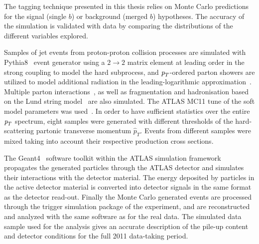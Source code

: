 The tagging technique presented in this thesis relies on Monte Carlo predictions for the signal (single $b$) or background (merged $b$) hypotheses. The accuracy of the simulation is validated with data by comparing the distributions of the different variables explored.

Samples of jet events from proton-proton collision processes are simulated with {\sc Pythia8}~\cite{PYTHIA8} event generator using a $2\rightarrow 2$ matrix element at leading order in the strong coupling to model the hard subprocess, and ${\emph{p}_{T}}$-ordered parton showers are utilized to model additional radiation in the leading-logarithmic approximation~\cite{Pythia_partonshowers}. Multiple parton interactions~\cite{Pythia_mpi}, as well as fragmentation and hadronisation based on the Lund string model~\cite{Lund_string_model} are also simulated.
The ATLAS MC11 tune of the soft model parameters was used~\cite{Pythia_MC11tune}.
In order to have sufficient statistics over the entire ${\emph{p}_{T}}$ spectrum, eight samples were generated with different thresholds of the hard-scattering partonic transverse momentum $\hat{p}_T$. Events from different samples were mixed taking into account their respective production cross sections.

The {\sc Geant4}~\cite{GEANT4} software toolkit within the ATLAS simulation framework~\cite{ATLASSimulation} propagates the generated particles through the ATLAS detector and simulates their interactions with the detector material. The energy deposited by particles in the active detector material is converted into detector signals in the same format as the detector read-out. Finally the Monte Carlo generated events are processed through the trigger simulation package of the experiment, and are reconstructed and analyzed with the same software as for the real data.
The simulated data sample used for the analysis %
gives an accurate description of the pile-up content and detector conditions for the full 2011 data-taking period. 

